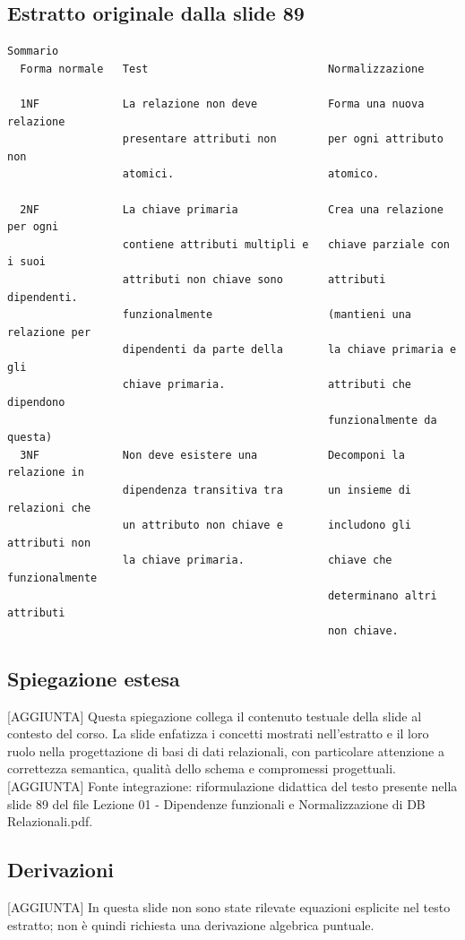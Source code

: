 \documentclass[11pt]{article}
\begin{document}
\subsection*{Estratto originale dalla slide 89}
\begin{lstlisting}
Sommario
  Forma normale   Test                            Normalizzazione

  1NF             La relazione non deve           Forma una nuova relazione
                  presentare attributi non        per ogni attributo non
                  atomici.                        atomico.

  2NF             La chiave primaria              Crea una relazione per ogni
                  contiene attributi multipli e   chiave parziale con i suoi
                  attributi non chiave sono       attributi dipendenti.
                  funzionalmente                  (mantieni una relazione per
                  dipendenti da parte della       la chiave primaria e gli
                  chiave primaria.                attributi che dipendono
                                                  funzionalmente da questa)
  3NF             Non deve esistere una           Decomponi la relazione in
                  dipendenza transitiva tra       un insieme di relazioni che
                  un attributo non chiave e       includono gli attributi non
                  la chiave primaria.             chiave che funzionalmente
                                                  determinano altri attributi
                                                  non chiave.
\end{lstlisting}
\subsection*{Spiegazione estesa}
[AGGIUNTA] Questa spiegazione collega il contenuto testuale della slide al contesto del corso. La slide enfatizza i concetti mostrati nell'estratto e il loro ruolo nella progettazione di basi di dati relazionali, con particolare attenzione a correttezza semantica, qualità dello schema e compromessi progettuali.
[AGGIUNTA] Fonte integrazione: riformulazione didattica del testo presente nella slide 89 del file Lezione 01 - Dipendenze funzionali e Normalizzazione di DB Relazionali.pdf.
\subsection*{Derivazioni}
[AGGIUNTA] In questa slide non sono state rilevate equazioni esplicite nel testo estratto; non è quindi richiesta una derivazione algebrica puntuale.
\end{document}

